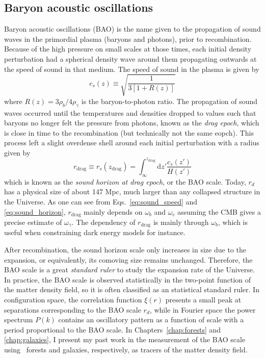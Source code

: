    
    \subsection{Baryon acoustic oscillations}
    \label{intro:probes:bao}

    Baryon acoustic oscillations (BAO) is the name given to the propagation of sound
    waves in the primordial plasma (baryons and photons), prior to recombination. 
    Because of the high pressure on small scales at those times, 
    each initial density perturbation had a spherical density wave around them 
    propagating outwards at the speed of sound in that medium. The speed of sound
    in the plasma is given by 
    \begin{equation}
        c_s(z) \equiv \sqrt{\frac{1}{3[1+R(z)]}}
        \label{eq:sound_speed}
    \end{equation}
    where $R(z) = 3\rho_b / 4 \rho_\gamma$ is the baryon-to-photon ratio.
    The propagation of sound waves occurred until the temperatures and densities 
    dropped to values such that baryons no longer 
    felt the pressure from photons, known as the \emph{drag epoch}, which is 
    close in time to the recombination (but technically not the same eopch). 
    This process left a slight overdense shell around each initial perturbation
    with a radius given by 
    \begin{equation}
        r_\mathrm{drag} \equiv r_s(z_\mathrm{drag}) = 
            \int_\infty^{z_\mathrm{drag}} \mathrm{d}z' \frac{c_s(z')}{H(z')}
        \label{eq:sound_horizon}
    \end{equation}
    which is known as the \emph{sound horizon at drag epoch}, or the BAO scale. 
    Today, $r_d$ has a physical size of about 147 Mpc, much larger than any 
    collapsed structure in the Universe. As one can see from Eqs.~\ref{eq:sound_speed}
    and \ref{eq:sound_horizon}, $r_\mathrm{drag}$ mainly depends on 
    $\omega_b$ and $\omega_c$ assuming the CMB gives a precise 
    estimate of $\omega_\gamma$. The dependency of $r_\mathrm{drag}$ 
    is mainly through $\omega_b$, which is useful 
    when constraining dark energy models for instance. 

    After recombination, the sound horizon scale only increases in size 
    due to the expansion, or equivalently, its comoving size remains unchanged. 
    Therefore, the BAO scale is a great \emph{standard ruler} to study the expansion 
    rate of the Universe. 
    In practice, the BAO scale is observed statistically in the 
    two-point function of the matter density field, so it is often 
    classified as an statistical standard ruler. 
    In configuration space, the correlation function $\xi(r)$ presents a small 
    peak at separations corresponding to the BAO scale $r_d$, while in Fourier space 
    the power spectrum $P(k)$ contains an oscillatory pattern as a function of scale 
    with a period proportional to the BAO scale.  
    In Chapters~\ref{chap:forests} and \ref{chap:galaxies}, I present 
    my past work in the measurement of the BAO scale using \lya\ forests 
    and galaxies, respectively, as tracers of the matter density field.
    
